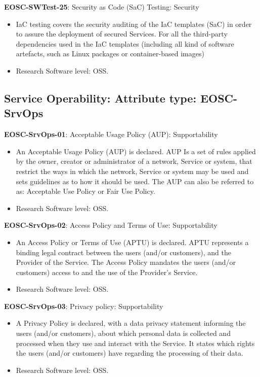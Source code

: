 \textbf{EOSC-SWTest-25}: Security as Code (SaC) Testing: Security

\begin{itemize}
    \item IaC testing covers the security auditing of the IaC templates (SaC) in order to assure the deployment of secured Services. For all the third-party dependencies used in the IaC templates (including all kind of software artefacts, such as Linux packages or container-based images) \cite{orviz_fernandez_eosc-synergy_2020}
    \item Research Software level: OSS.
\end{itemize}

\subsection{Service Operability: Attribute type: EOSC-SrvOps}

\textbf{EOSC-SrvOps-01}: Acceptable Usage Policy (AUP): Supportability

\begin{itemize}
    \item An Acceptable Usage Policy (AUP) is declared. AUP Is a set of rules applied by the owner, creator or administrator of a network, Service or system, that restrict the ways in which the network, Service or system may be used and sets guidelines as to how it should be used. The AUP can also be referred to as: Acceptable Use Policy or Fair Use Policy. \cite{orviz_fernandez_eosc-synergy_2020}
    \item Research Software level: OSS.
\end{itemize}

\textbf{EOSC-SrvOps-02}: Access Policy and Terms of Use: Supportability

\begin{itemize}
    \item An Access Policy or Terms of Use (APTU) is declared. APTU represents a binding legal contract between the users (and/or customers), and the Provider of the Service. The Access Policy mandates the users (and/or customers) access to and the use of the Provider's Service. \cite{orviz_fernandez_eosc-synergy_2020}
    \item Research Software level: OSS.
\end{itemize}

\textbf{EOSC-SrvOps-03}: Privacy policy: Supportability

\begin{itemize}
    \item A Privacy Policy is declared, with a data privacy statement informing the users (and/or customers), about which personal data is collected and processed when they use and interact with the Service. It states which rights the users (and/or customers) have regarding the processing of their data. \cite{orviz_fernandez_eosc-synergy_2020}
    \item Research Software level: OSS.
\end{itemize}

